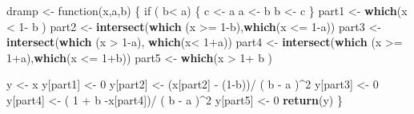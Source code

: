 \documentclass[]{article}
\newenvironment{Shaded}{\begin{snugshade}}{\end{snugshade}}
\newcommand{\KeywordTok}[1]{\textcolor[rgb]{0.13,0.29,0.53}{\textbf{{#1}}}}
\newcommand{\DecValTok}[1]{\textcolor[rgb]{0.00,0.00,0.81}{{#1}}}
\newcommand{\StringTok}[1]{\textcolor[rgb]{0.31,0.60,0.02}{{#1}}}
\newcommand{\NormalTok}[1]{{#1}}
\begin{document}
\begin{Shaded}
\begin{Highlighting}[]
\NormalTok{dramp <-}\StringTok{ }\NormalTok{function(x,a,b) \{}
  \NormalTok{if ( b<}\StringTok{ }\NormalTok{a) \{}
    \NormalTok{c <-}\StringTok{ }\NormalTok{a}
    \NormalTok{a <-}\StringTok{ }\NormalTok{b}
    \NormalTok{b <-}\StringTok{ }\NormalTok{c}
  \NormalTok{\}}
  \NormalTok{part1 <-}\StringTok{ }\KeywordTok{which}\NormalTok{(x <}\StringTok{ }\DecValTok{1}\NormalTok{-}\StringTok{ }\NormalTok{b )}
  \NormalTok{part2 <-}\StringTok{ }\KeywordTok{intersect}\NormalTok{(}\KeywordTok{which} \NormalTok{(x >=}\StringTok{ }\DecValTok{1}\NormalTok{-b),}\KeywordTok{which}\NormalTok{(x <=}\StringTok{ }\DecValTok{1}\NormalTok{-a))}
  \NormalTok{part3 <-}\StringTok{ }\KeywordTok{intersect}\NormalTok{(}\KeywordTok{which} \NormalTok{(x >}\StringTok{ }\DecValTok{1}\NormalTok{-a), }\KeywordTok{which}\NormalTok{(x<}\StringTok{ }\DecValTok{1}\NormalTok{+a))}
  \NormalTok{part4 <-}\StringTok{ }\KeywordTok{intersect}\NormalTok{(}\KeywordTok{which} \NormalTok{(x >=}\StringTok{ }\DecValTok{1}\NormalTok{+a),}\KeywordTok{which}\NormalTok{(x <=}\StringTok{ }\DecValTok{1}\NormalTok{+b))}
  \NormalTok{part5 <-}\StringTok{ }\KeywordTok{which}\NormalTok{(x >}\StringTok{ }\DecValTok{1}\NormalTok{+}\StringTok{ }\NormalTok{b )}

  \NormalTok{y <-}\StringTok{ }\NormalTok{x}
  \NormalTok{y[part1] <-}\StringTok{ }\DecValTok{0}
  \NormalTok{y[part2] <-}\StringTok{ }\NormalTok{(x[part2] -}\StringTok{ }\NormalTok{(}\DecValTok{1}\NormalTok{-b))/}\StringTok{ }\NormalTok{( b -}\StringTok{ }\NormalTok{a )^}\DecValTok{2}
  \NormalTok{y[part3] <-}\StringTok{ }\DecValTok{0}
  \NormalTok{y[part4] <-}\StringTok{ }\NormalTok{( }\DecValTok{1} \NormalTok{+}\StringTok{ }\NormalTok{b -x[part4])/}\StringTok{ }\NormalTok{( b -}\StringTok{ }\NormalTok{a )^}\DecValTok{2}
  \NormalTok{y[part5] <-}\StringTok{ }\DecValTok{0}
  \KeywordTok{return}\NormalTok{(y)}
\NormalTok{\}}


\end{Highlighting}
\end{Shaded}
\end{document}
